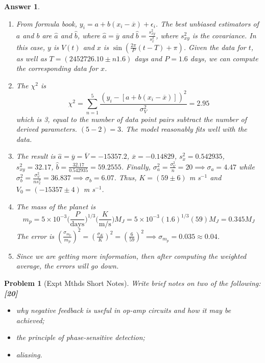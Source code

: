 \documentclass[a4paper]{article}
\newtheorem{ans}{Answer}[subsection]
\theoremstyle{new}
\newtheorem{qns}{Problem}[subsection]
\begin{document}
\begin{ans}\leavevmode
\begin{enumerate}[label=(\roman*)]
\item From formula book, $y_i=a+b(x_i-\overline{x})+\epsilon_i$. The best unbiased estimators of $a$ and $b$ are $\hat{a}$ and $\hat{b}$, where $\hat{a}=\overline{y}$ and $\hat{b}=\frac{s_{xy}^2}{s_x^2}$, where $s_{xy}^2$ is the covariance. In this case, $y$ is $V(t)$ and $x$ is $\sin(\frac{2\pi}{P}(t-T)+\pi)$. Given the data for $t$, as well as $T=(2452726.10\pm n1.6)$ days and $P=1.6$ days, we can compute the corresponding data for $x$.
\item The $\chi^2$ is
$$\chi^2=\sum_{n=1}^5\frac{(y_i-[a+b(x_i-\overline{x})])^2}{\sigma_V^2}=2.95$$
which is 3, equal to the number of data point pairs subtract the number of derived parameters. $(5-2)=3$. The model reasonably fits well with the data.
\item The result is $\hat{a}=\overline{y}=\overline{V}=-15357.2$, $\overline{x}=-0.14829$, $s_x^2=0.542935$, $s_{xy}^2=32.17$, $\hat{b}=\frac{32.17}{0.542935}=59.2555$. Finally, $\sigma_a^2=\frac{\sigma_V^2}{n}=20\implies\sigma_a=4.47$ while $\sigma_b^2=\frac{\sigma_V^2}{ns_x^2}=36.837\implies\sigma_b=6.07$. Thus, $K=(59\pm 6)$ m s$^{-1}$ and $V_0=(-15357\pm 4)$ m s$^{-1}$.
\item The mass of the planet is
$$m_p=5\times10^{-3}\bigg(\frac{P}{\text{days}}\bigg)^{1/3}\bigg(\frac{K}{\text{m/s}}\bigg)M_J=5\times10^{-3}(1.6)^{1/3}(59)M_J=0.345 M_J$$
The error is $(\frac{\sigma_{m_p}}{m_p})^2=(\frac{\sigma_K}{K})^2=(\frac{6}{59})^2\implies\sigma_{m_p}=0.035\approx 0.04$.
\item Since we are getting more information, then after computing the weighted average, the errors will go down.
\end{enumerate}
\end{ans}
\newpage
\begin{qns}[Expt Mthds Short Notes]
Write brief notes on two of the following:\hfill\textbf{[20]}
\begin{itemize}
    \item why negative feedback is useful in op-amp circuits and how it may be achieved;
    \item the principle of phase-sensitive detection;
    \item aliasing.
\end{itemize}
\end{qns}
\end{document}
